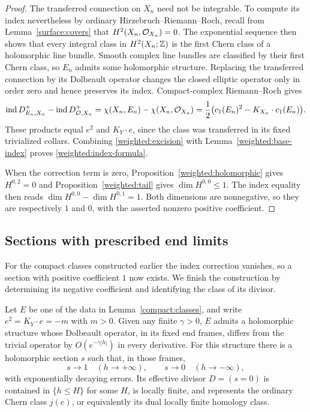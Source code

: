 \begin{proof}
The transferred connection on $X_n$ need not be integrable. To compute
its index nevertheless by ordinary Hirzebruch--Riemann--Roch, recall
from Lemma~\ref{surface:covers} that $H^2(X_n,\mathcal O_{X_n})=0$. The
exponential sequence then shows that every integral class in $H^2(X_n;\mathbb Z)$
is the first Chern class of a holomorphic line bundle. Smooth complex
line bundles are classified by their first Chern class, so $E_n$ admits
some holomorphic structure. Replacing the transferred connection by
its Dolbeault operator changes the closed elliptic operator only in
order zero and hence preserves its index. Compact-complex Riemann--Roch
\cite[\S4]{AtiyahSingerIII1968} gives
\[
 \operatorname{ind} D_{E_n,X_n}^+-\operatorname{ind} D_{\mathcal O,X_n}^+
 =\chi(X_n,E_n)-\chi(X_n,\mathcal O_{X_n})
 =\frac12\bigl(c_1(E_n)^2-K_{X_n}\cdot c_1(E_n)\bigr).
\]
These products equal $e^2$ and $K_Y\cdot e$, since the class was
transferred in its fixed trivialized collars. Combining
\eqref{weighted:excision} with Lemma~\ref{weighted:base-index} proves
\eqref{weighted:index-formula}.

When the correction term is zero, Proposition~\ref{weighted:holomorphic}
gives $H^{0,2}=0$ and Proposition~\ref{weighted:tail} gives
$\dim H^{0,0}\le1$. The index equality then reads
$\dim H^{0,0}-\dim H^{0,1}=1$. Both dimensions are nonnegative,
so they are respectively $1$ and $0$, with the asserted nonzero
positive coefficient.
\end{proof}

\subsection{Sections with prescribed end limits}

For the compact classes constructed earlier the index correction
vanishes, so a section with positive coefficient $1$ now exists.
We finish the construction by determining its negative coefficient
and identifying the class of its divisor.

\begin{proposition}
\label{compact:section}
Let $E$ be one of the data in Lemma~\ref{compact:classes}, and write
$e^2=K_Y\cdot e=-m$ with $m>0$. Given any finite $\gamma>0$, $E$ admits
a holomorphic structure whose Dolbeault operator, in its fixed end
frames, differs from the trivial operator by $O(e^{-\gamma|h|})$ in
every derivative. For this structure there is a holomorphic section $s$
such that, in those frames,
\begin{equation}\label{compact:end-limits}
 s\longrightarrow1\quad(h\to+\infty),\qquad
 s\longrightarrow0\quad(h\to-\infty),
\end{equation}
with exponentially decaying errors. Its effective divisor $D=(s=0)$
is contained in $\{h\leq H\}$ for some $H$, is locally finite, and
represents the ordinary Chern class $j(e)$, or equivalently its dual
locally finite homology class.
\end{proposition}

